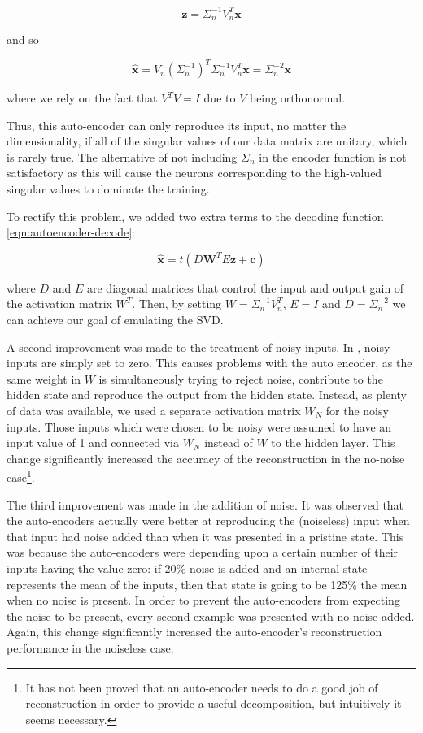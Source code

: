 \documentclass{article}
\begin{document}
\begin{equation}
\mathbf{z} = \Sigma_n^{-1} V_n^T \mathbf{x}
\end{equation}

and so

\begin{equation}
\hat{\mathbf{x}} = V_n \left( \Sigma_n^{-1} \right)^T \Sigma_n^{-1} V_n^T \mathbf{x} = \Sigma_n^{-2} \mathbf{x}
\end{equation}

where we rely on the fact that $V^T V = I$ due to $V$ being orthonormal.

Thus, this auto-encoder can only reproduce its input, no matter the dimensionality, if all of the singular values of our data matrix are unitary, which is rarely true.  The alternative of not including $\Sigma_n$ in the encoder function is not satisfactory as this will cause the neurons corresponding to the high-valued singular values to dominate the training.

To rectify this problem, we added two extra terms to the decoding function \ref{eqn:autoencoder-decode}:

\begin{equation}
\label{eqn:autoencoder-decode-improved}
\hat{\mathbf{x}} = t(D \mathbf{W}^T E \mathbf{z} + \mathbf{c})
\end{equation}

where $D$ and $E$ are diagonal matrices that control the input and output gain of the activation matrix $W^T$.  Then, by setting $W = \Sigma_n^{-1} V_n^T$, $E = I$ and $D = \Sigma_n^{-2}$ we can achieve our goal of emulating the SVD.

A second improvement was made to the treatment of noisy inputs.  In \cite{Vincent-TR1316}, noisy inputs are simply set to zero.  This causes problems with the auto encoder, as the same weight in $W$ is simultaneously trying to reject noise, contribute to the hidden state and reproduce the output from the hidden state.  Instead, as plenty of data was available, we used a separate activation matrix $W_N$ for the noisy inputs.  Those inputs which were chosen to be noisy were assumed to have an input value of 1 and connected via $W_N$ instead of $W$ to the hidden layer.  This change significantly increased the accuracy of the reconstruction in the no-noise case\footnote{It has not been proved that an auto-encoder needs to do a good job of reconstruction in order to provide a useful decomposition, but intuitively it seems necessary.}.

The third improvement was made in the addition of noise.  It was observed that the auto-encoders actually were better at reproducing the (noiseless) input when that input had noise added than when it was presented in a pristine state.
This was because the auto-encoders were depending upon a certain number of their inputs having the value zero: if 20\% noise is added and an internal state represents the mean of the inputs, then that state is going to be 125\% the mean when no noise is present.
In order to prevent the auto-encoders from expecting the noise to be present, every second example was presented with no noise added.  Again, this change significantly increased the auto-encoder's reconstruction performance in the noiseless case.
\end{document}
